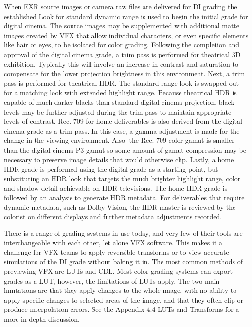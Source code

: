 When EXR source images or camera raw files are delivered for DI grading the established Look for standard dynamic range is used to begin the initial grade for digital cinema. The source images may be supplemented with additional matte images created by VFX that allow individual characters, or even specific elements like hair or eyes, to be isolated for color grading. Following the completion and approval of the digital cinema grade, a trim pass is performed for theatrical 3D exhibition. Typically this will involve an increase in contrast and saturation to compensate for the lower projection brightness in this environment. Next, a trim pass is performed for theatrical HDR. The standard range look is swapped out for a matching look with extended highlight range. Because theatrical HDR is capable of much darker blacks than standard digital cinema projection, black levels may be further adjusted during the trim pass to maintain appropriate levels of contrast. Rec. 709 for home deliverables is also derived from the digital cinema grade as a trim pass. In this case, a gamma adjustment is made for the change in the viewing environment. Also, the Rec. 709 color gamut is smaller than the digital cinema P3 gamut so some amount of gamut compression may be necessary to preserve image details that would otherwise clip. Lastly, a home HDR grade is performed using the digital grade as a starting point, but substituting an HDR look that targets the much brighter highlight range, color and shadow detail achievable on HDR televisions. The home HDR grade is followed by an analysis to generate HDR metadata. For deliverables that require dynamic metadata, such as Dolby Vision, the HDR master is reviewed by the colorist on different displays and further metadata adjustments recorded.

There is a range of grading systems in use today, and very few of their tools are interchangeable with each other, let alone VFX software. This makes it a challenge for VFX teams to apply reversible transforms or to view accurate simulations of the DI grade without baking it in. The most common methods of previewing VFX are LUTs and CDL. Most color grading systems can export grades as a LUT, however, the limitations of LUTs apply. The two main limitations are that they apply changes to the whole image, with no ability to apply specific changes to selected areas of the image, and that they often clip or produce interpolation errors. See the Appendix 4.4 LUTs and Transforms for a more in-depth discussion.

